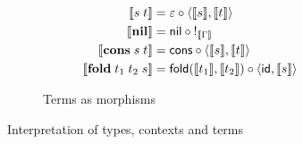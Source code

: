 \begin{figure}
\begin{subfigure}{0.8\linewidth}
\begin{align*}
  \\
  \sem{\tmApp{s}{t}} &= \eval \comp \prodM{\sem{s}}{\sem{t}}
  \\
  \sem{\tmNil} &= \nil \comp {!_{\sem{\Gamma}}}
  \\
  \sem{\tmCons{s}{t}} &= \cons \comp \prodM{\sem{s}}{\sem{t}}
  \\
  \sem{\tmFoldList{t_1}{t_2}{s}} &= \fold(\sem{t_1},\sem{t_2}) \comp \prodM{\id}{\sem{s}}
  \end{align*}
  \caption{Terms as morphisms}
  \label{fig:semantics:terms}
\end{subfigure}
\caption{Interpretation of types, contexts and terms} %
\end{figure}
